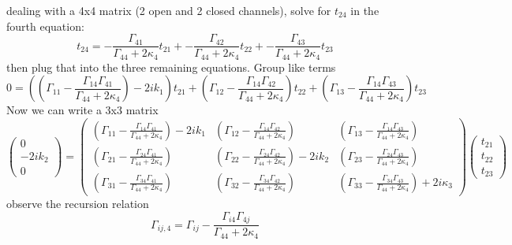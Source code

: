 dealing with a 4x4 matrix (2 open and 2 closed channels), solve for $t_{24}$ in the fourth equation:
\begin{equation}
t_{24} = -\frac{\Gamma_{41}}{\Gamma_{44}+2\kappa_4} t_{21} + 
         -\frac{\Gamma_{42}}{\Gamma_{44}+2\kappa_4} t_{22} +
         -\frac{\Gamma_{43}}{\Gamma_{44}+2\kappa_4} t_{23}
\end{equation}
then plug that into the three remaining equations. Group like terms
\begin{equation}
0 = ((\Gamma_{11}-\frac{\Gamma_{14}\Gamma_{41}}{\Gamma_{44}+2 \kappa_4}) - 2 i k_1)t_{21} + 
     (\Gamma_{12}-\frac{\Gamma_{14}\Gamma_{42}}{\Gamma_{44}+2 \kappa_4})t_{22} + 
     (\Gamma_{13}-\frac{\Gamma_{14}\Gamma_{43}}{\Gamma_{44}+2 \kappa_4})t_{23}  
\end{equation}
Now we can write a 3x3 matrix
\begin{equation}
 \left( \begin{array}{c}
0 \\
-2 i k_2 \\
0 \end{array} \right) =
 \left( \begin{array}{cccc}
(\Gamma_{11}-\frac{\Gamma_{14}\Gamma_{41}}{\Gamma_{44}+2 \kappa_4})-2 i k_1 &
(\Gamma_{12}-\frac{\Gamma_{14}\Gamma_{42}}{\Gamma_{44}+2 \kappa_4})           & 
(\Gamma_{13}-\frac{\Gamma_{14}\Gamma_{43}}{\Gamma_{44}+2 \kappa_4})            \\
(\Gamma_{21}-\frac{\Gamma_{24}\Gamma_{41}}{\Gamma_{44}+2 \kappa_4})         &
(\Gamma_{22}-\frac{\Gamma_{24}\Gamma_{42}}{\Gamma_{44}+2 \kappa_4})-2 i k_2 &
(\Gamma_{23}-\frac{\Gamma_{24}\Gamma_{43}}{\Gamma_{44}+2 \kappa_4})              \\
(\Gamma_{31}-\frac{\Gamma_{34}\Gamma_{41}}{\Gamma_{44}+2 \kappa_4})         &
(\Gamma_{32}-\frac{\Gamma_{34}\Gamma_{42}}{\Gamma_{44}+2 \kappa_4})         &
(\Gamma_{33}-\frac{\Gamma_{34}\Gamma_{43}}{\Gamma_{44}+2 \kappa_4})+2 i \kappa_3 \end{array} \right)
 \left( \begin{array}{c}
t_21 \\
t_22 \\
t_23 \end{array} \right) 
\label{singlescattererfirstfold}
\end{equation}
observe the recursion relation
\begin{equation}
\Gamma_{ij,4} = \Gamma_{ij} - \frac{\Gamma_{i4}\Gamma_{4j}}{\Gamma_{44}+2 \kappa_4}
\end{equation}
